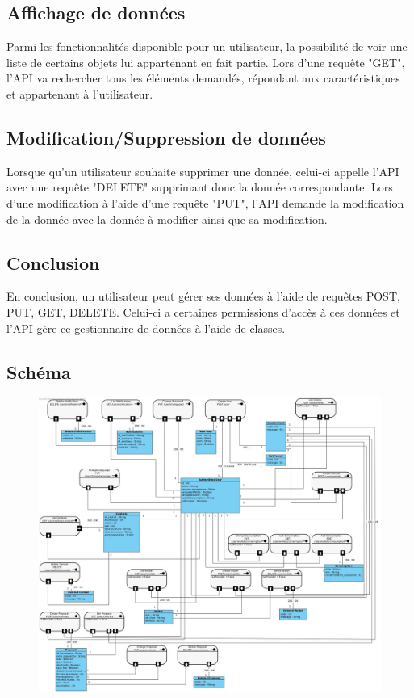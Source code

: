 \subsection{Affichage de données}
\begin{flushleft}
Parmi les fonctionnalités disponible pour un utilisateur, la possibilité de voir une liste de certains objets lui appartenant en fait partie. Lors d'une requête "GET", l'API va rechercher tous les éléments demandés, répondant aux caractéristiques et appartenant à l'utilisateur.
\end{flushleft}

\subsection{Modification/Suppression de données}
\begin{flushleft}
Lorsque qu'un utilisateur souhaite supprimer une donnée, celui-ci appelle l'API avec une requête "DELETE" supprimant donc la donnée correspondante. Lors d'une modification à l'aide d'une requête "PUT", l'API demande la modification de la donnée avec la donnée à modifier ainsi que sa modification.
\end{flushleft}

\subsection{Conclusion}
\begin{flushleft}
En conclusion, un utilisateur peut gérer ses données à l'aide de requêtes POST, PUT, GET, DELETE. Celui-ci a certaines permissions d'accès à ces données et l'API gère ce gestionnaire de données à l'aide de classes.
\newpage

\end{flushleft}
\subsection{Schéma}
\begin{figure}[h]
\includegraphics[scale=0.2]{Base/api-rest/img/apirest.jpg}
\end{figure}

